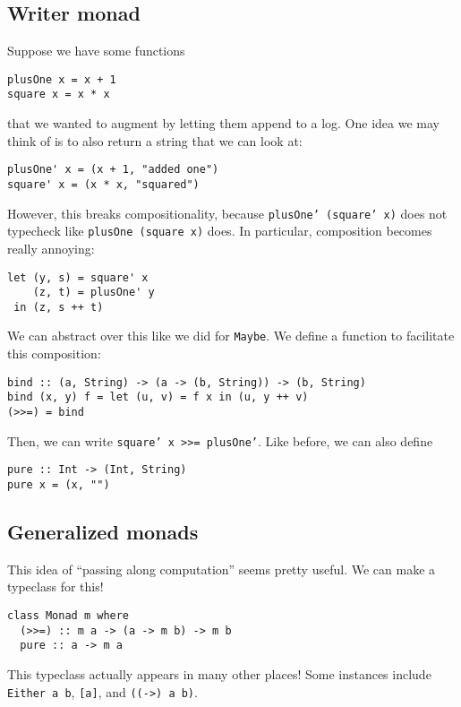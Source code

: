 \documentclass[class=scrartcl]{standalone}
\begin{document}
\subsection{Writer monad}
Suppose we have some functions
\begin{verbatim}
plusOne x = x + 1
square x = x * x
\end{verbatim}
that we wanted to augment by letting them append to a log.
One idea we may think of is to also return a string that we can look at:
\begin{verbatim}
plusOne' x = (x + 1, "added one")
square' x = (x * x, "squared")
\end{verbatim}
However, this breaks compositionality, because
\texttt{plusOne' (square' x)}
does not typecheck like
\texttt{plusOne (square x)}
does.
In particular, composition becomes really annoying:
\begin{verbatim}
let (y, s) = square' x
    (z, t) = plusOne' y
 in (z, s ++ t)
\end{verbatim}

We can abstract over this like we did for \texttt{Maybe}.
We define a function to facilitate this composition:
\begin{verbatim}
bind :: (a, String) -> (a -> (b, String)) -> (b, String)
bind (x, y) f = let (u, v) = f x in (u, y ++ v)
(>>=) = bind
\end{verbatim}
Then, we can write \texttt{square' x >>= plusOne'}.
Like before, we can also define
\begin{verbatim}
pure :: Int -> (Int, String)
pure x = (x, "")
\end{verbatim}

\subsection{Generalized monads}
This idea of ``passing along computation'' seems pretty useful.
We can make a typeclass for this!
\begin{verbatim}
class Monad m where
  (>>=) :: m a -> (a -> m b) -> m b
  pure :: a -> m a
\end{verbatim}

This typeclass actually appears in many other places!
Some instances include
\texttt{Either a b},
\texttt{[a]}, and
\texttt{((->) a b)}.
\end{document}
